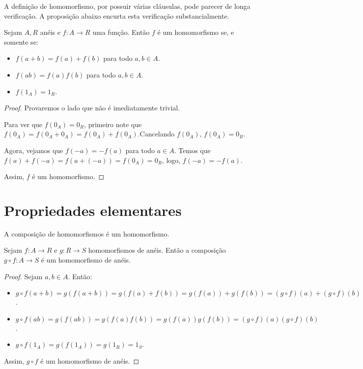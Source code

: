 A definição de homomorfismo, por possuir várias cláusulas, pode parecer de longa verificação.
A proposição abaixo encurta esta verificação substancialmente.

\begin{prop}
    Sejam $A, R$ anéis e $f:A\rightarrow R$ uma função.
    Então $f$ é um homomorfismo se, e somente se:
    \begin{itemize}
        \item $f(a+b)=f(a)+f(b)$ para todo $a, b \in A$.
        \item $f(ab)=f(a)f(b)$ para todo $a, b \in A$.
        \item $f(1_A)=1_R$.
    \end{itemize}
\end{prop}
\begin{proof}
    Provaremos o lado que não é imediatamente trivial.

    Para ver que $f(0_A)=0_R$, primeiro note que $f(0_A)=f(0_A+0_A)=f(0_A)+f(0_A)$.Cancelando $f(0_A)$, $f(0_A)=0_R$.

    Agora, vejamos que $f(-a)=-f(a)$ para todo $a \in A$.
    Temos que $f(a)+f(-a)=f(a+(-a))=f(0_A)=0_R$, logo, $f(-a)=-f(a)$.

    Assim, $f$ é um homomorfismo.
\end{proof}

\section{Propriedades elementares}
A composição de homomorfismos é um homomorfismo.
\begin{lemma}\label{prop:homoIdeal_composicao}
    Sejam $f:A\rightarrow R$ e $g:R\rightarrow S$ homomorfismos de anéis.
    Então a composição $g\circ f:A\rightarrow S$ é um homomorfismo de anéis.
\end{lemma}

\begin{proof}
    Sejam $a, b \in A$. Então:
    \begin{itemize}
        \item $g\circ f(a+b)=g(f(a+b))=g(f(a)+f(b))=g(f(a))+g(f(b))=(g\circ f)(a)+(g\circ f)(b)$.
        \item $g\circ f(ab)=g(f(ab))=g(f(a)f(b))=g(f(a))g(f(b))=(g\circ f)(a)(g\circ f)(b)$.
        \item $g\circ f(1_A)=g(f(1_A))=g(1_R)=1_S$.
    \end{itemize}
    Assim, $g\circ f$ é um homomorfismo de anéis.
\end{proof}

